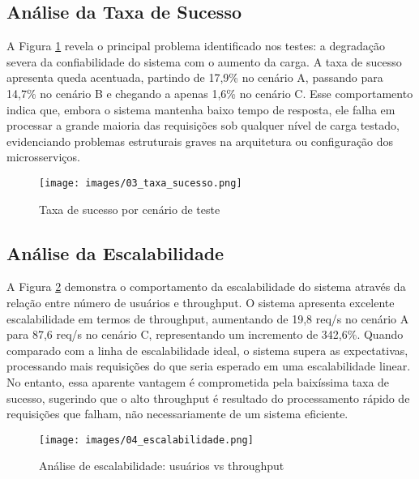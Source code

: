 \documentclass[conference]{IEEEtran}
\begin{document}
    \subsection{Análise da Taxa de Sucesso}

    A Figura \ref{fig:taxa_sucesso} revela o principal problema identificado nos
    testes: a degradação severa da confiabilidade do sistema com o aumento da carga.
    A taxa de sucesso apresenta queda acentuada, partindo de 17,9\% no cenário
    A, passando para 14,7\% no cenário B e chegando a apenas 1,6\% no cenário C.
    Esse comportamento indica que, embora o sistema mantenha baixo tempo de resposta,
    ele falha em processar a grande maioria das requisições sob qualquer nível
    de carga testado, evidenciando problemas estruturais graves na arquitetura ou
    configuração dos microsserviços.

    \begin{figure}[htbp]
        \centerline{\texttt{[image: images/03\_taxa\_sucesso.png]}}
        \caption{Taxa de sucesso por cenário de teste}
        \label{fig:taxa_sucesso}
    \end{figure}

    \subsection{Análise da Escalabilidade}

    A Figura \ref{fig:escalabilidade} demonstra o comportamento da escalabilidade
    do sistema através da relação entre número de usuários e throughput. O
    sistema apresenta excelente escalabilidade em termos de throughput, aumentando
    de 19,8 req/s no cenário A para 87,6 req/s no cenário C, representando um
    incremento de 342,6\%. Quando comparado com a linha de escalabilidade ideal,
    o sistema supera as expectativas, processando mais requisições do que seria
    esperado em uma escalabilidade linear. No entanto, essa aparente vantagem é
    comprometida pela baixíssima taxa de sucesso, sugerindo que o alto throughput
    é resultado do processamento rápido de requisições que falham, não
    necessariamente de um sistema eficiente.

    \begin{figure}[htbp]
        \centerline{\texttt{[image: images/04\_escalabilidade.png]}}
        \caption{Análise de escalabilidade: usuários vs throughput}
        \label{fig:escalabilidade}
    \end{figure}
\end{document}
